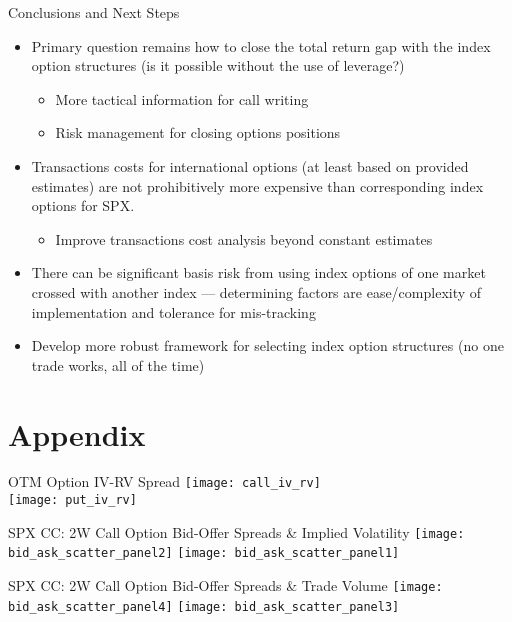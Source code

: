 \documentclass{beamer}
\begin{document}
\begin{frame}{Conclusions and Next Steps}
\begin{itemize}
\item Primary question remains how to close the total return gap with the index option structures (is it possible without the use of leverage?)
\begin{itemize}
\item More tactical information for call writing
\item Risk management for closing options positions
\end {itemize}
\end{itemize}
\vfill
\begin{itemize}
\item Transactions costs for international options (at least based on provided estimates) are not prohibitively more expensive than corresponding index options for SPX.
\begin{itemize}
\item Improve transactions cost analysis beyond constant estimates
\end{itemize}
\vfill
\item There can be significant basis risk from using index options of one market crossed with another index --- determining factors are ease/complexity of implementation and tolerance for mis-tracking
\vfill
\item Develop more robust framework for selecting index option structures (no one trade works, all of the time)
\vfill
\end{itemize}

\end{frame}

\section{Appendix}

\begin{frame}{OTM Option IV-RV Spread}
\texttt{[image: call\_iv\_rv]}\\
\texttt{[image: put\_iv\_rv]}
\end{frame}

\begin{frame}{\large SPX CC: 2W Call Option Bid-Offer Spreads \& Implied Volatility}
\texttt{[image: bid\_ask\_scatter\_panel2]}
\texttt{[image: bid\_ask\_scatter\_panel1]}
\end{frame}

\begin{frame}{\large SPX CC: 2W Call Option Bid-Offer Spreads \& Trade Volume}
\texttt{[image: bid\_ask\_scatter\_panel4]}
\texttt{[image: bid\_ask\_scatter\_panel3]}
\end{frame}
\end{document}

